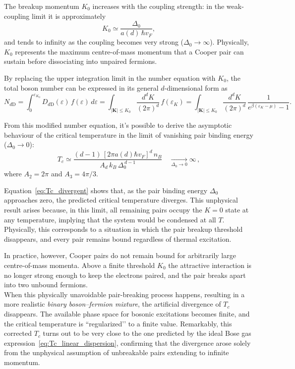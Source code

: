 The breakup momentum \(K_0\) increases with the coupling strength:  
in the weak-coupling limit it is approximately
\[
K_0 \simeq \frac{\Delta_0}{a(d)\,\hbar v_F},
\]
and tends to infinity as the coupling becomes very strong (\(\Delta_0 \to \infty\)).  
Physically, \(K_0\) represents the maximum centre-of-mass momentum that a Cooper pair can sustain before dissociating into unpaired fermions.

By replacing the upper integration limit in the number equation with \(K_0\),  
the total boson number can be expressed in its general \(d\)-dimensional form as
\begin{equation}
N_{d\mathrm{D}} 
= \int_0^{\varepsilon_{K_0}} D_{d\mathrm{D}}(\varepsilon)\, f(\varepsilon)\, d\varepsilon
= \int_{|\mathbf K|\le K_0}\!\frac{d^d K}{(2\pi)^d}\, f(\varepsilon_K)
= \int_{|\mathbf K|\le K_0}\!\frac{d^d K}{(2\pi)^d}\,
      \frac{1}{e^{\beta(\varepsilon_K-\mu)} - 1}.
\end{equation}

From this modified number equation, it's possible to derive the asymptotic behaviour of the critical temperature in the limit of vanishing pair binding energy (\(\Delta_0 \to 0\)):
\begin{equation}
\boxed{
T_c \simeq
\frac{(d-1)\,[2\pi a(d)\hbar v_F]^d\, n_B}
{A_d\, k_B\, \Delta_0^{\,d-1}}
\quad \xrightarrow[\Delta_0 \to 0]{} \infty}\, ,
\label{eq:Tc_divergent}
\end{equation}
where \(A_2 = 2\pi\) and \(A_3 = 4\pi/3\).

Equation~\eqref{eq:Tc_divergent} shows that, as the pair binding energy \(\Delta_0\) approaches zero, the predicted critical temperature diverges.  
This unphysical result arises because, in this limit, all remaining pairs occupy the \(K = 0\) state at any temperature, implying that the system would be condensed at all \(T\).  
Physically, this corresponds to a situation in which the pair breakup threshold disappears, and every pair remains bound regardless of thermal excitation.

In practice, however, Cooper pairs do not remain bound for arbitrarily large centre-of-mass momenta.
Above a finite threshold $K_0$ the attractive interaction is no longer strong enough to keep the electrons paired, and the pair breaks apart into two unbound fermions.\\
When this physically unavoidable pair-breaking process happens, resulting in a more realistic \textit{binary boson–fermion mixture}, the artificial divergence of $T_c$ disappears.
The available phase space for bosonic excitations becomes finite, and the critical temperature is “regularized’’ to a finite value. Remarkably, this corrected $T_c$ turns out to be very close to the one predicted by the ideal Bose gas expression~\eqref{eq:Tc_linear_dispersion}, confirming that the divergence arose solely from the unphysical assumption of unbreakable pairs extending to infinite momentum.

